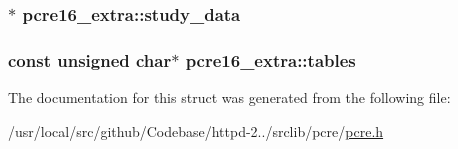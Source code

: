 \subsubsection[{\texorpdfstring{study\+\_\+data}{study_data}}]{$\ast$ pcre16\+\_\+extra\+::study\+\_\+data}\hypertarget{structpcre16__extra_aec36980135877dc589e960145408d5a2}{}\label{structpcre16__extra_aec36980135877dc589e960145408d5a2}
\subsubsection[{\texorpdfstring{tables}{tables}}]{\setlength{\rightskip}{0pt plus 5cm}const unsigned char$\ast$ pcre16\+\_\+extra\+::tables}\hypertarget{structpcre16__extra_acb2e6cb1effab8fcaec3f3cc06b163b2}{}\label{structpcre16__extra_acb2e6cb1effab8fcaec3f3cc06b163b2}


The documentation for this struct was generated from the following file\+:\begin{DoxyCompactItemize}
\item 
/usr/local/src/github/\+Codebase/httpd-\/2../srclib/pcre/\hyperlink{pcre_8h}{pcre.\+h}\end{DoxyCompactItemize}
